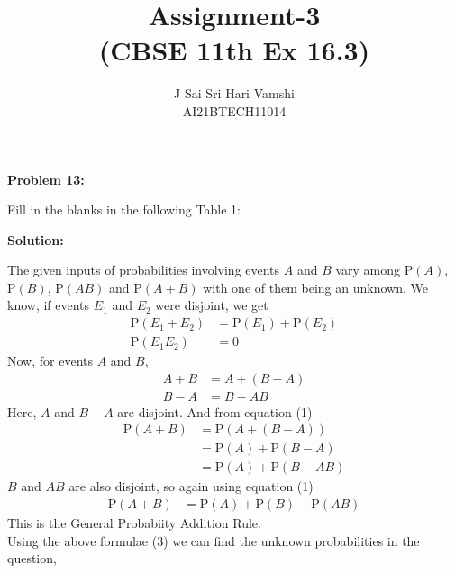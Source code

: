 \documentclass[journal,12pt,twocolumn]{article}\usepackage[margin=1.25 in]{geometry}
\title{\LARGE{\textbf{Assignment-3}\\(CBSE 11th Ex 16.3)}}
\author{\normalsize J Sai Sri Hari Vamshi\\ \footnotesize AI21BTECH11014}
\date{}
\providecommand{\pr}[1]{\ensuremath{\text{P}\left(#1\right)}}
\begin{document}
\maketitle
\begin{center}
    \textbf{\large Problem 13:}
\end{center}
\noindent Fill in the blanks in the following Table 1:

\begin{table}[h!]
\label{table}

\caption{}
\end{table}

\begin{center}
    \textbf{\large Solution:}
\end{center}

\noindent The given inputs of probabilities involving events $A$ and $B$ vary among $\pr A$, $\pr B$, $\pr{AB}$ and $\pr{A+B}$ with one of them being an unknown.
\noindent We know, if events $E_1$ and $E_2$ were disjoint, we get
\begin{align}
\pr{E_1 + E_2} & = \pr{E_1} + \pr{E_2} \\
\pr{E_1 E_2} & = 0
\end{align}
\noindent Now, for events $A$ and $B$,
\begin{align*}
A + B & = A + (B - A) \\
B - A & = B - AB
\end{align*}
\noindent Here, $A$ and $B - A$ are disjoint. And from equation (1)
\begin{align*}
\pr{A + B} & = \pr{A + (B - A)}\\
& = \pr A + \pr{B - A}\\
& = \pr A + \pr{B - AB}
\end{align*}
\noindent $B$ and $AB$ are also disjoint, so again using equation (1)
\begin{align}
\pr{A + B} & = \pr A + \pr B - \pr{AB}
\end{align}
\noindent This is the General Probabiity Addition Rule.\\
\noindent Using the above formulae (3) we can find the unknown probabilities in the question,
\end{document}
